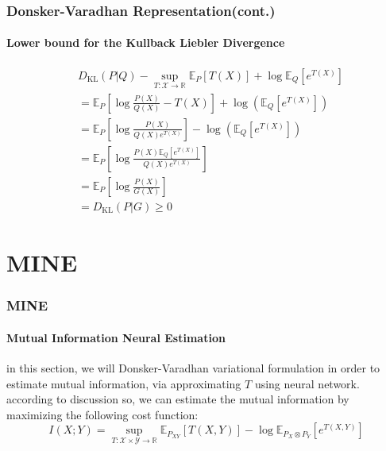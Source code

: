\documentclass[aspectratio=169]{beamer}
\begin{document}
	\begin{frame}
		\frametitle{Donsker-Varadhan Representation(cont.)}
		\framesubtitle{Lower bound for the Kullback Liebler Divergence}
		\begin{align}
			&D_{\text{KL}}(P | Q) -\sup_{T: \mathcal{X} \rightarrow \mathbb{R}} {\mathbb{E}_P[T(X)] + \log \mathbb{E}_Q[e^{T(X)}]}\\
			&= \mathbb{E}_P[\log \frac{P(X)}{Q(X)}-T(X)] + \log(\mathbb{E}_Q[e^{T(X)}])\\
			&= \mathbb{E}_P[\log \frac{P(X)}{Q(X) e^{T(X)}}] - \log(\mathbb{E}_Q[e^{T(X)}])\\
			&= \mathbb{E}_P[\log \frac{P(X)\mathbb{E}_Q[e^{T(X)}]}{Q(X) e^{T(X)}}]\\
			&= \mathbb{E}_P[\log \frac{P(X)}{G(X)}]\\
			&= D_{\text{KL}}(P|G) \geq 0
		\end{align}
	\end{frame}

	



\section{MINE}
\begin{frame}
	\frametitle{MINE}
	\framesubtitle{Mutual Information Neural Estimation}
	in this section, we will Donsker-Varadhan variational formulation in order to estimate mutual information,
	via approximating $T$ using neural network. according to discussion so,
	we can estimate the mutual information by maximizing the following cost function:
	\begin{equation}
		I(X;Y) = \sup_{T: \mathcal{X} \times \mathcal{Y} \rightarrow \mathbb{R}}
		{\mathbb{E}_{P_{XY}}[T(X,Y)] - \log \mathbb{E}_{P_X \otimes P_Y}[e^{T(X,Y)}]}
	\end{equation}
\end{frame}
\end{document}
